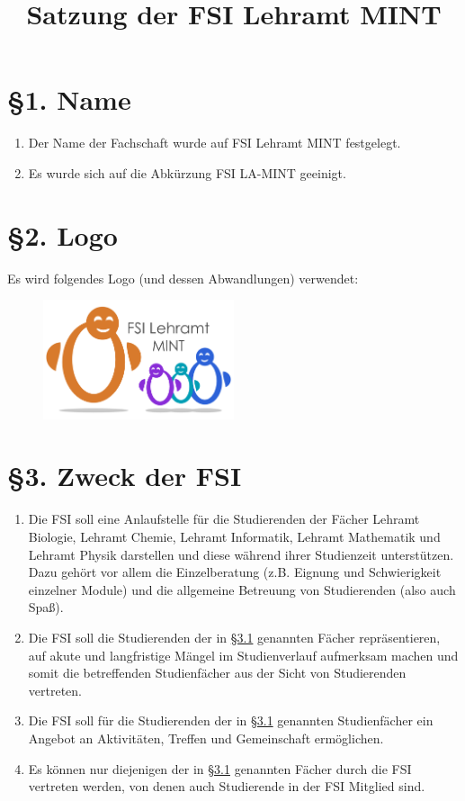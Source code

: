 \documentclass[12pt]{article}
\title{Satzung der FSI Lehramt MINT}
\date{\satzungsdatum}
\begin{document}
\maketitle

\section*{§1. Name}

\begin{enumerate}
    \item Der Name der Fachschaft wurde auf FSI Lehramt MINT festgelegt.
    \item Es wurde sich auf die Abkürzung FSI LA-MINT geeinigt.
\end{enumerate}

\section*{§2. Logo}

	Es wird folgendes Logo (und dessen Abwandlungen) verwendet:
	\begin{figure}[h]
		\includegraphics[width=0.5\textwidth]{img/logo_MINT.png}
	\end{figure}

\section*{§3. Zweck der FSI}

\begin{enumerate}
	\item
		\label{3.1}
		Die FSI soll eine Anlaufstelle für die Studierenden der Fächer Lehramt Biologie, Lehramt Chemie, Lehramt Informatik, Lehramt Mathematik und Lehramt Physik
		darstellen und diese während ihrer Studienzeit
		unterstützen. Dazu gehört vor allem die Einzelberatung (z.B.
		Eignung und Schwierigkeit einzelner Module) und die allgemeine
		Betreuung von Studierenden (also auch Spaß).
	\item
		Die FSI soll die Studierenden der in \hyperref[3.1]{§3.1} genannten Fächer
		repräsentieren, auf akute und langfristige Mängel im
		Studienverlauf aufmerksam machen und somit die betreffenden Studienfächer aus der Sicht von Studierenden vertreten.
	\item
		Die FSI soll für die Studierenden der in \hyperref[3.1]{§3.1} genannten Studienfächer
		ein Angebot an Aktivitäten, Treffen und Gemeinschaft
		ermöglichen.
	\item
		Es können nur diejenigen der in \hyperref[3.1]{§3.1} genannten Fächer durch die FSI vertreten werden, von denen auch Studierende in der FSI Mitglied sind.
\end{enumerate}
\end{document}
